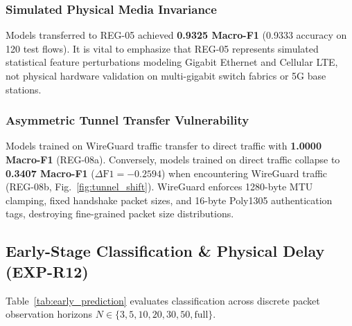 \documentclass[conference]{IEEEtran}
\begin{document}
\subsubsection{Simulated Physical Media Invariance}
Models transferred to REG-05 achieved \textbf{0.9325 Macro-F1} (0.9333 accuracy on 120 test flows). It is vital to emphasize that REG-05 represents simulated statistical feature perturbations modeling Gigabit Ethernet and Cellular LTE, not physical hardware validation on multi-gigabit switch fabrics or 5G base stations.

\subsubsection{Asymmetric Tunnel Transfer Vulnerability}
Models trained on WireGuard traffic transfer to direct traffic with \textbf{1.0000 Macro-F1} (REG-08a). Conversely, models trained on direct traffic collapse to \textbf{0.3407 Macro-F1} ($\Delta\text{F1} = -0.2594$) when encountering WireGuard traffic (REG-08b, Fig.~\ref{fig:tunnel_shift}). WireGuard enforces 1280-byte MTU clamping, fixed handshake packet sizes, and 16-byte Poly1305 authentication tags, destroying fine-grained packet size distributions.

\subsection{Early-Stage Classification \& Physical Delay (EXP-R12)}
Table~\ref{tab:early_prediction} evaluates classification across discrete packet observation horizons $N \in \{3, 5, 10, 20, 30, 50, \text{full}\}$.
\end{document}
